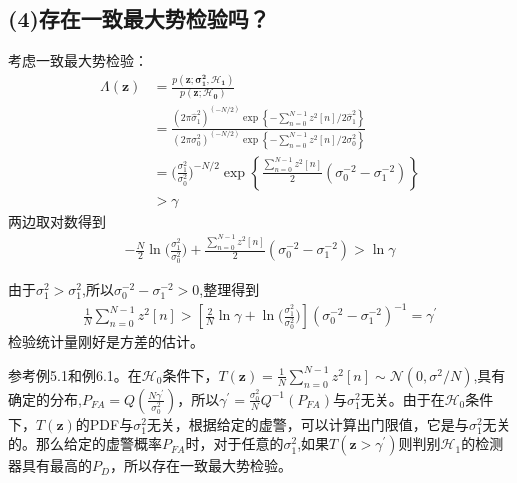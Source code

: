 \documentclass[fontset=windows]{article}
\numberwithin{figure}{section}
\begin{document}
\subsection*{(4)存在一致最大势检验吗？}
考虑一致最大势检验：
\begin{align*}
    \Lambda(\mathbf{z})
     & =\frac{p(\mathbf{z;\sigma^2_1,\mathcal{H}_1})}{p(\mathbf{z;\mathcal{H}_0})}                            \\
     & =\frac{(2\pi \hat{\sigma}_1^2)^{(-N/2)}\exp \left\{ -\sum_{n=0}^{N-1}z^2[n]/2\hat{\sigma}_1^2\right\}}
    {(2\pi \sigma_0^2)^{(-N/2)}
    \exp \left\{ -\sum_{n=0}^{N-1}z^2[n]/2\sigma^2_0\right\}}                                                 \\
     & =\bigg(\frac{\sigma_1^2}{\sigma_0^2}\bigg)^{-N/2}
    \exp \left\{\frac{\sum_{n=0}^{N-1}z^2[n]}{2}(\sigma_0^{-2}-\sigma_1^{-2}) \right\}                        \\
     & >\gamma
\end{align*}
两边取对数得到
\begin{align*}
    -\frac{N}{2}\ln\bigg(\frac{\sigma_1^2}{\sigma_0^2}\bigg)+
    \frac{\sum_{n=0}^{N-1}z^2[n]}{2}(\sigma_0^{-2}-\sigma_1^{-2})>\ln\gamma
\end{align*}

由于\(\sigma_1^2>\sigma_1^2\),所以\(\sigma_0^{-2}-\sigma_1^{-2}>0\),整理得到
\begin{align*}
    \frac{1}{N}\sum_{n=0}^{N-1}z^2[n]>\left[\frac{2}{N}\ln\gamma+\ln\bigg(\frac{\sigma_1^2}{\sigma_0^2}\bigg)\right](\sigma_0^{-2}-\sigma_1^{-2})^{-1}=\gamma^{\prime}
\end{align*}
检验统计量刚好是方差的估计。

参考例5.1和例6.1。在\(\mathcal{H}_0\)条件下，\(T(\mathbf{z})=\frac{1}{N}\sum_{n=0}^{N-1}z^2[n]\sim \mathcal{N}(0,\sigma^2/N)\),具有确定的分布,\(P_{FA}=Q(\frac{N\gamma^{\prime}}{\sigma_0^2})\)，所以\(\gamma^{\prime}=\frac{\sigma^2_0}{N}Q^{-1}(P_{FA})\)与\(\sigma_1^2\)无关。由于在\(\mathcal{H}_0\)条件下，\(T(\mathbf{z})\)的PDF与\(\sigma_1^2\)无关，根据给定的虚警，可以计算出门限值，它是与\(\sigma_1^2\)无关的。那么给定的虚警概率\(P_{FA}\)时，对于任意的\(\sigma_1^2\),如果\(T(\mathbf{z}>\gamma^{\prime})\)则判别\(\mathcal{H}_1\)的检测器具有最高的\(P_D\)，所以存在一致最大势检验。



\end{document}
